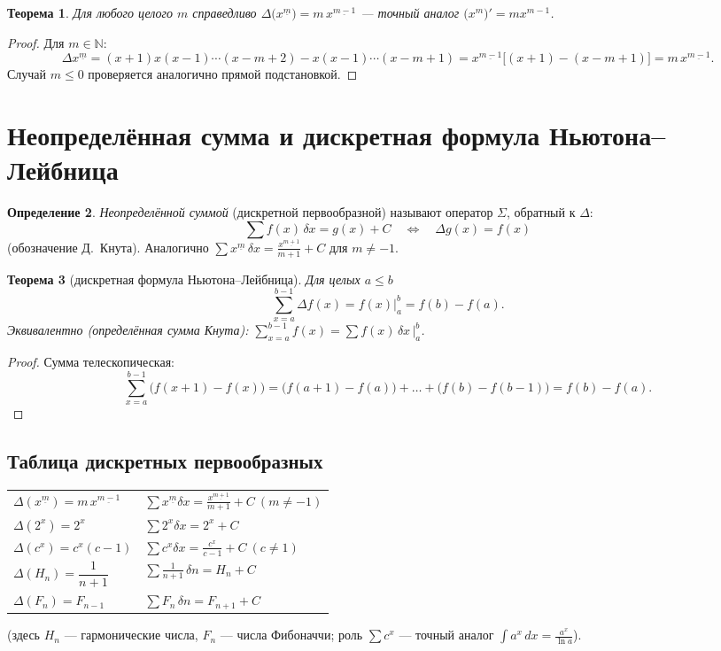 \documentclass[11pt,a4paper]{article}
\theoremstyle{definition}
\newtheorem{definition}{Определение}[section]
\theoremstyle{plain}
\newtheorem{theorem}[definition]{Теорема}
\newcommand{\N}{\mathbb{N}}
\renewcommand{\le}{\leqslant}
\begin{document}
\begin{theorem}
Для любого целого $m$ справедливо $\Delta\bigl(x^{\underline m}\bigr)=m\,x^{\underline{m-1}}$ —
точный аналог $\bigl(x^m\bigr)'=mx^{m-1}$.
\end{theorem}

\begin{proof}
Для $m\in\N$:
\[
  \Delta x^{\underline m}=(x+1)x(x-1)\cdots(x-m+2)-x(x-1)\cdots(x-m+1)
   =x^{\underline{m-1}}\bigl[(x+1)-(x-m+1)\bigr]=m\,x^{\underline{m-1}}.
\]
Случай $m\le0$ проверяется аналогично прямой подстановкой.
\end{proof}

\section{Неопределённая сумма и дискретная формула Ньютона–Лейбница}

\begin{definition}
\emph{Неопределённой суммой} (дискретной первообразной) называют оператор $\Sigma$, обратный к
$\Delta$:
\[
  \sum f(x)\,\delta x=g(x)+C\quad\iff\quad \Delta g(x)=f(x)
\]
(обозначение Д.~Кнута). Аналогично $\displaystyle\sum x^{\underline m}\,\delta x
=\frac{x^{\underline{m+1}}}{m+1}+C$ для $m\ne-1$.
\end{definition}

\begin{theorem}[дискретная формула Ньютона–Лейбница]
Для целых $a\le b$
\[
  \sum_{x=a}^{b-1}\Delta f(x)=f(x)\Big|_a^b=f(b)-f(a).
\]
Эквивалентно (определённая сумма Кнута):
$\displaystyle\sum_{x=a}^{b-1}f(x)=\sum f(x)\,\delta x\,\Big|_a^b$.
\end{theorem}

\begin{proof}
Сумма телескопическая:
\[
  \sum_{x=a}^{b-1}\bigl(f(x+1)-f(x)\bigr)=\bigl(f(a+1)-f(a)\bigr)+\dots+\bigl(f(b)-f(b-1)\bigr)
   =f(b)-f(a).
\]
\end{proof}

\subsection{Таблица дискретных первообразных}

\begin{center}
\renewcommand{\arraystretch}{1.5}
\begin{tabular}{ll}
$\Delta(x^{\underline{m}})=m\,x^{\underline{m-1}}$ & $\displaystyle\sum x^{\underline m}\delta x
  =\frac{x^{\underline{m+1}}}{m+1}+C\ (m\ne-1)$\\
$\Delta(2^{x})=2^{x}$ & $\displaystyle\sum 2^{x}\delta x=2^{x}+C$\\
$\Delta(c^{x})=c^{x}(c-1)$ & $\displaystyle\sum c^{x}\delta x=\frac{c^{x}}{c-1}+C\ (c\ne1)$\\
$\Delta(H_n)=\dfrac{1}{n+1}$ & $\displaystyle\sum \frac{1}{n+1}\,\delta n=H_n+C$\\
$\Delta(F_n)=F_{n-1}$ & $\displaystyle\sum F_n\,\delta n=F_{n+1}+C$\\
\end{tabular}
\end{center}
(здесь $H_n$ — гармонические числа, $F_n$ — числа Фибоначчи; роль $\sum c^x$ — точный аналог
$\int a^x\,dx=\tfrac{a^x}{\ln a}$).
\end{document}
